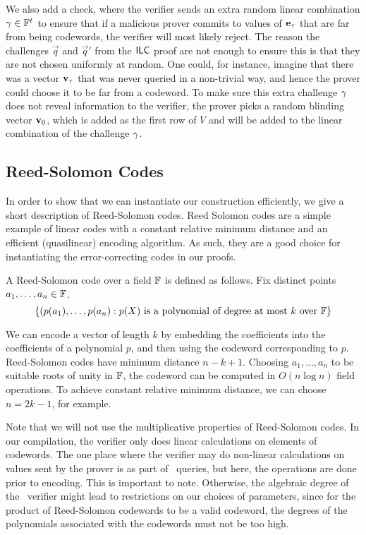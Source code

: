 We also add a check, where the verifier sends an extra random linear combination ${\mathbf{\gamma}}\in \mathbb{F}^{t_{}}$ to ensure that if a malicious prover commits to values of $\mathbf{e}_\tau$ that are far from being codewords, the verifier will most likely reject. The reason the challenges $\vec{q}$ and $\vec{q}'$ from the $\mathsf{ILC}$ proof are not enough to ensure this is that they are not chosen uniformly at random. One could, for instance, imagine that there was a vector ${\mathbf{v}}_\tau$ that was never queried in a non-trivial way, and hence the prover could choose it to be far from a codeword. To make sure this extra challenge ${\mathbf{\gamma}}$ does not reveal information to the verifier, the prover picks a random blinding vector ${\mathbf{v}}_0$, which is added as the first row of $V$ and will be added to the linear combination of the challenge ${\mathbf{\gamma}}$.

\subsection{Reed-Solomon Codes}

In order to show that we can instantiate our construction efficiently, we give a short description of Reed-Solomon codes. Reed Solomon codes are a simple example of linear codes with a constant relative minimum distance and an efficient (quasilinear) encoding algorithm. As such, they are a good choice for instantiating the error-correcting codes in our proofs.

A Reed-Solomon code over a field $\mathbb{F}$ is defined as follows. Fix distinct points $a_1,\ldots,a_n \in \mathbb{F}$.
\[
\lbrace (p(a_1),\ldots,p(a_n) : p(X) \text{ is a polynomial of degree at most } k \text{ over } \mathbb{F} \rbrace
\]

We can encode a vector of length $k$ by embedding the coefficients into the coefficients of a polynomial $p$, and then using the codeword corresponding to $p$. Reed-Solomon codes have minimum distance $n-k+1$. Choosing $a_1,\ldots,a_n$ to be suitable roots of unity in $\mathbb{F}$, the codeword can be computed in $O(n \log n)$ field operations. To achieve constant relative minimum distance, we can choose $n=2k-1$, for example.

Note that we will not use the multiplicative properties of Reed-Solomon codes. In our compilation, the verifier only does linear calculations on elements of codewords. The one place where the verifier may do non-linear calculations on values sent by the prover is as part of \ILCcheck\ queries, but here, the operations are done prior to encoding. This is important to note. Otherwise, the algebraic degree of the \ILC\ verifier might lead to restrictions on our choices of parameters, since for the product of Reed-Solomon codewords to be a valid codeword, the degrees of the polynomials associated with the codewords must not be too high.

